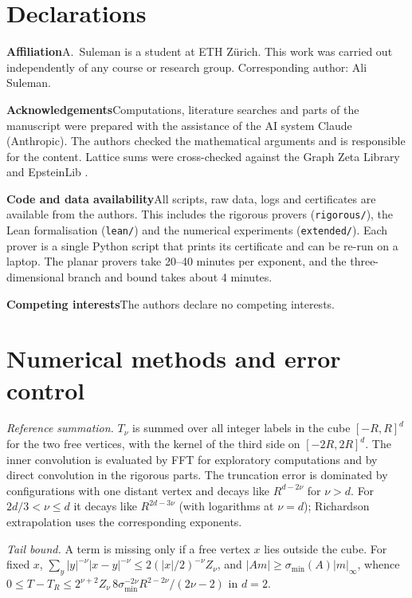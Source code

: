 \documentclass[10pt,twocolumn,a4paper]{article}
\theoremstyle{definition}
\begin{document}
\section*{Declarations}
\noindent\textbf{Affiliation}\enspace A.~Suleman is a student at ETH Z\"urich. This work was carried out independently of any course or research group. Corresponding author: Ali Suleman.

\smallskip\noindent\textbf{Acknowledgements}\enspace Computations, literature searches and parts of the manuscript were prepared with the assistance of the AI system Claude (Anthropic). The authors checked the mathematical arguments and is responsible for the content. Lattice sums were cross-checked against the Graph Zeta Library \cite{BuchheitRupp} and EpsteinLib \cite{EpsteinLib}.

\smallskip\noindent\textbf{Code and data availability}\enspace All scripts, raw data, logs and certificates are available from the authors. This includes the rigorous provers (\texttt{rigorous/}), the Lean formalisation (\texttt{lean/}) and the numerical experiments (\texttt{extended/}). Each prover is a single Python script that prints its certificate and can be re-run on a laptop. The planar provers take 20--40 minutes per exponent, and the three-dimensional branch and bound takes about 4 minutes.

\smallskip\noindent\textbf{Competing interests}\enspace The authors declare no competing interests.

\appendix
\section{Numerical methods and error control}\label{app:numerics}
\noindent\emph{Reference summation.} $T_\nu$ is summed over all integer labels in the cube $[-R,R]^d$ for the two free vertices, with the kernel of the third side on $[-2R,2R]^d$. The inner convolution is evaluated by FFT for exploratory computations and by direct convolution in the rigorous parts. The truncation error is dominated by configurations with one distant vertex and decays like $R^{d-2\nu}$ for $\nu>d$. For $2d/3<\nu\le d$ it decays like $R^{2d-3\nu}$ (with logarithms at $\nu=d$); Richardson extrapolation uses the corresponding exponents.

\smallskip\noindent\emph{Tail bound.} A term is missing only if a free vertex $x$ lies outside the cube. For fixed $x$, $\sum_y|y|^{-\nu}|x-y|^{-\nu}\le2(|x|/2)^{-\nu}Z_\nu$, and $|Am|\ge\sigma_{\min}(A)|m|_\infty$, whence
$0\le T-T_R\le2^{\nu+2}Z_\nu\,8\sigma_{\min}^{-2\nu}R^{2-2\nu}/(2\nu-2)$ in $d=2$.
\end{document}
